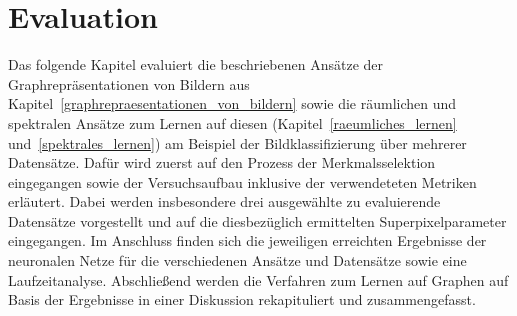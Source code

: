 \chapter{Evaluation}
\label{evaluation}

Das folgende Kapitel evaluiert die beschriebenen Ansätze der Graphrepräsentationen von Bildern aus Kapitel~\ref{graphrepraesentationen_von_bildern} sowie die räumlichen und spektralen Ansätze zum Lernen auf diesen (Kapitel~\ref{raeumliches_lernen} und~\ref{spektrales_lernen}) am Beispiel der Bildklassifizierung über mehrerer Datensätze.
Dafür wird zuerst auf den Prozess der Merkmalsselektion eingegangen sowie der Versuchsaufbau inklusive der verwendeteten Metriken erläutert.
Dabei werden insbesondere drei ausgewählte zu evaluierende Datensätze vorgestellt und auf die diesbezüglich ermittelten Superpixelparameter eingegangen.
Im Anschluss finden sich die jeweiligen erreichten Ergebnisse der neuronalen Netze für die verschiedenen Ansätze und Datensätze sowie eine Laufzeitanalyse.
Abschließend werden die Verfahren zum Lernen auf Graphen auf Basis der Ergebnisse in einer Diskussion rekapituliert und zusammengefasst.






